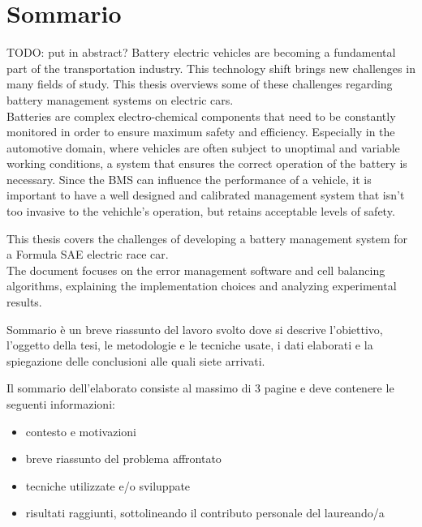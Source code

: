 \chapter*{Sommario} %
\label{sommario}


\label{cha:intro}
TODO: put in abstract?
Battery electric vehicles are becoming a fundamental part of the transportation industry. This technology shift brings new challenges in many fields of study. This thesis overviews some of these challenges regarding battery management systems on electric cars.\\
Batteries are complex electro-chemical components that need to be constantly monitored in order to ensure maximum safety and efficiency. Especially in the automotive domain, where vehicles are often subject to unoptimal and variable working conditions, a system that ensures the correct operation of the battery is necessary. Since the BMS can influence the performance of a vehicle, it is important to have a well designed and calibrated management system that isn't too invasive to the vehichle's operation, but retains acceptable levels of safety.

This thesis covers the challenges of developing a battery management system for a Formula SAE electric race car.\\ The document focuses on the error management software and cell balancing algorithms, explaining the implementation choices and analyzing experimental results.

Sommario è un breve riassunto del lavoro svolto dove si descrive l'obiettivo, l'oggetto della tesi, le
metodologie e le tecniche usate, i dati elaborati e la spiegazione delle conclusioni alle quali siete arrivati.

Il sommario dell’elaborato consiste al massimo di 3 pagine e deve contenere le seguenti informazioni:
\begin{itemize}
  \item contesto e motivazioni
  \item breve riassunto del problema affrontato
  \item tecniche utilizzate e/o sviluppate
  \item risultati raggiunti, sottolineando il contributo personale del laureando/a
\end{itemize}




